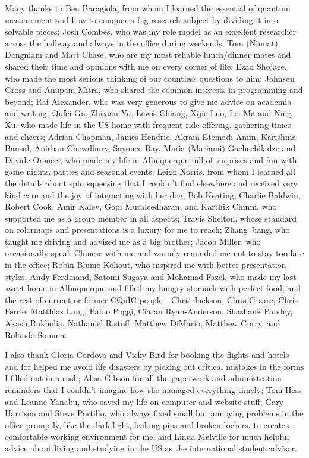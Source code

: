 \begin{acknowledgments}
Many thanks to Ben Baragiola, from whom I learned the essential of quantum measurement and how to conquer a big research subject by dividing it into solvable pieces; Josh Combes, who was my role model as an excellent researcher across the hallway and always in the office during weekends; Tom (Ninnat) Dangniam and Matt Chase, who are my most reliable lunch/dinner mates and shared their time and opinions with me on every corner of life; Ezad Shojaee, who made the most serious thinking of our countless questions to him; Johnson Gross and Anupam Mitra, who shared the common interests in programming and beyond; Raf Alexander, who was very generous to give me advice on academia and writing; Qufei Gu, Zhixian Yu, Lewis Chiang, Xijie Luo, Lei Ma and Ning Xu, who made life in the US home with frequent ride offering, gathering times and cheers; Adrian Chapman, James Hendrie, Akram Etemadi Amin, Karishma Bansal, Anirban Chowdhury, Sayonee Ray, Maria (Mariami) Gachechiladze and Davide Orsucci, who made my life in Albuquerque full of surprises and fun with game nights, parties and seasonal events; Leigh Norris, from whom I learned all the details about spin squeezing that I couldn't find elsewhere and received very kind care and the joy of interacting with her dog; Bob Keating, Charlie Baldwin, Robert Cook, Amir Kalev, Gopi Muraleedharan, and Karthik Chinni, who supported me as a group member in all aspects; Travis Shelton, whose standard on colormaps and presentations is a luxury for me to reach; Zhang Jiang, who taught me driving and advised me as a big brother; Jacob Miller, who occasionally speak Chinese with me and warmly reminded me not to stay too late in the office; Robin Blume-Kohout, who inspired me with better presentation styles; Andy Ferdinand, Satomi Sugaya and Mohamad Fazel, who made my last sweet home in Albuquerque and filled my hungry stomach with perfect food; and the rest of current or former CQuIC people---Chris Jackson, Chris Cesare, Chris Ferrie, Matthias Lang, Pablo Poggi, Ciaran Ryan-Anderson, Shashank Pandey, Akash Rakholia, Nathaniel Ristoff, Matthew DiMario, Matthew Curry, and Rolando Somma.

I also thank Gloria Cordova and Vicky Bird for booking the flights and hotels and for helped me avoid life disasters by picking out critical mistakes in the forms I filled out in a rush; Alisa Gibson for all the paperwork and administration reminders that I couldn't imagine how she managed everything timely; Tom Hess and Leanne Yanabu, who saved my life on computer and website stuff; Gary Harrison and Steve Portillo, who always fixed small but annoying problems in the office promptly, like the dark light, leaking pips and broken lockers, to create a comfortable working environment for me; and Linda Melville for much helpful advice about living and studying in the \hbox{US} as the international student advisor.
\end{acknowledgments} 